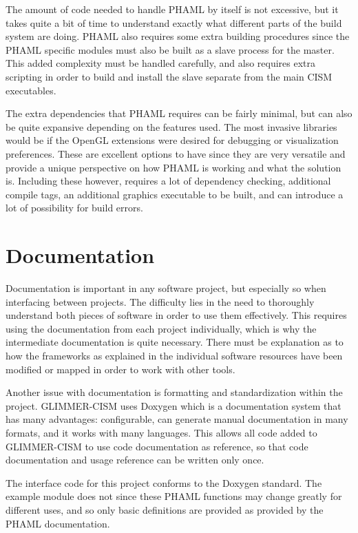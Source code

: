 The amount of code needed to handle PHAML by itself is not excessive, but it takes quite a bit of time to understand exactly what different parts of the build system are doing.  PHAML also requires some extra building procedures since the PHAML specific modules must also be built as a slave process for the master.  This added complexity must be handled carefully, and also requires extra scripting in order to build and install the slave separate from the main CISM executables.

The extra dependencies that PHAML requires can be fairly minimal, but can also be quite expansive depending on the features used.  The most invasive libraries would be if the OpenGL extensions were desired for debugging or visualization preferences.  These are excellent options to have since they are very versatile and provide a unique perspective on how PHAML is working and what the solution is.  Including these however, requires a lot of dependency checking, additional compile tags, an additional graphics executable to be built, and can introduce a lot of possibility for build errors.


\section{Documentation}\label{sec:ch4doc}

Documentation is important in any software project, but especially so when interfacing between projects.  The difficulty lies in the need to thoroughly understand both pieces of software in order to use them effectively.  This requires using the documentation from each project individually, which is why the intermediate documentation is quite necessary.  There must be explanation as to how the frameworks as explained in the individual software resources have been modified or mapped in order to work with other tools.

Another issue with documentation is formatting and standardization within the project.  GLIMMER-CISM uses Doxygen which is a documentation system that has many advantages:  configurable, can generate manual documentation in many formats, and it works with many languages.  \citep{doxygen:website} This allows all code added to GLIMMER-CISM to use code documentation as reference, so that code documentation and usage reference can be written only once.

The interface code for this project conforms to the Doxygen standard.  The example module does not since these PHAML functions may change greatly for different uses, and so only basic definitions are provided as provided by the PHAML documentation.
